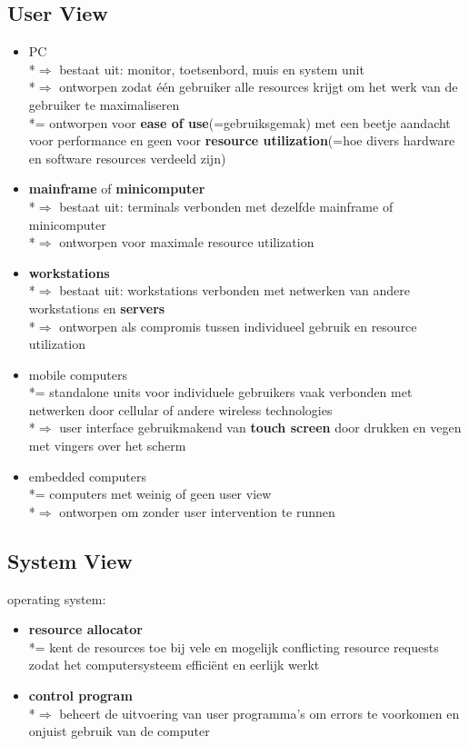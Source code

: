 \documentclass{report}
\begin{document}
\subsection{User View}
\begin{itemize}
	\item PC
	\\*$\Rightarrow$ bestaat uit: monitor, toetsenbord, muis en system unit
	\\*$\Rightarrow$ ontworpen zodat \'e\'en gebruiker alle resources krijgt om het werk van de gebruiker te maximaliseren
	\\*= ontworpen voor \textbf{ease of use}(=gebruiksgemak) met een beetje aandacht voor performance en geen voor \textbf{resource utilization}(=hoe divers hardware en software resources verdeeld zijn)
	\item \textbf{mainframe} of \textbf{minicomputer}
	\\*$\Rightarrow$ bestaat uit: terminals verbonden met dezelfde mainframe of minicomputer
	\\*$\Rightarrow$ ontworpen voor maximale resource utilization
	\item \textbf{workstations}
	\\*$\Rightarrow$ bestaat uit: workstations verbonden met netwerken van andere workstations en \textbf{servers}
	\\*$\Rightarrow$ ontworpen als compromis tussen individueel gebruik en resource utilization
	\item mobile computers
	\\*= standalone units voor individuele gebruikers vaak verbonden met netwerken door cellular of andere wireless technologies
	\\*$\Rightarrow$ user interface gebruikmakend van \textbf{touch screen} door drukken en vegen met vingers over het scherm
	\item embedded computers
	\\*= computers met weinig of geen user view
	\\*$\Rightarrow$ ontworpen om zonder user intervention te runnen
\end{itemize}

\subsection{System View}
operating system:
\begin{itemize}
	\item\textbf{resource allocator}
	\\*= kent de resources toe bij vele en mogelijk conflicting resource requests zodat het computersysteem effici\"ent en eerlijk werkt
	\item\textbf{control program} 
	\\*$\Rightarrow$ beheert de uitvoering van user programma's om errors te voorkomen en onjuist gebruik van de computer
\end{itemize}
\end{document}
